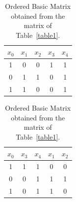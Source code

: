 \documentclass[authoryear,preprint,review,12pt]{elsarticle}
\begin{document}
\begin{table}[!htb]
    \begin{minipage}{.5\linewidth}
      \caption{Basic Matrix for the example.}\label{table1}
      \centering
        \begin{tabular}{ ccccc }
 			\hline                       
  			$x_0$ & $x_1$ & $x_2$ & $x_3$ & $x_4$ \\
  			\hline
  			1 & 0 & 0 & 1 & 1 \\
  			0 & 1 & 1 & 0 & 1 \\
  			1 & 1 & 0 & 0 & 1 \\
  			\hline  
		\end{tabular}
    \end{minipage}%
    \begin{minipage}{.5\linewidth}
      \centering
        \caption{Ordered Basic Matrix obtained from the matrix of Table~\ref{table1}.}\label{table2}
        \begin{tabular}{ ccccc }
 			\hline                       
  			$x_0$ & $x_3$ & $x_4$ & $x_1$ & $x_2$ \\
  			\hline
  			1 & 1 & 1 & 0 & 0 \\
  			0 & 0 & 1 & 1 & 1 \\
  			1 & 0 & 1 & 1 & 0 \\
  			\hline  
		\end{tabular}
    \end{minipage} 
\end{table}

\newcommand{\lcell}[2][2in]{$\vcenter{\hsize#1\baselineskip11pt\vspace*{2.5pt}\raggedright#2\strut}$}
\end{document}
